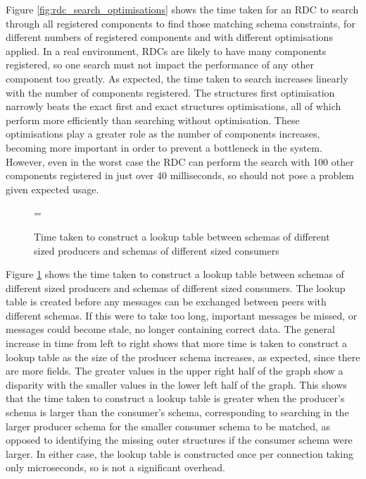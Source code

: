 \documentclass[12pt,twoside,notitlepage]{report}
\begin{document}
Figure \ref{fig:rdc_search_optimisations} shows the time taken for an RDC to search through all registered components to find those matching schema constraints, for different numbers of registered components and with different optimisations applied. 
In a real environment, RDCs are likely to have many components registered, so one search must not impact the performance of any other component too greatly.
As expected, the time taken to search increases linearly with the number of components registered. 
The structures first optimisation narrowly beats the exact first and exact structures optimisations, all of which perform more efficiently than searching without optimisation. 
These optimisations play a greater role as the number of components increases, becoming more important in order to prevent a bottleneck in the system. 
However, even in the worst case the RDC can perform the search with 100 other components registered in just over 40 milliseconds, so should not pose a problem given expected usage.

\begin{figure}[t]
\epsfxsize=\hsize
\centerline{}
\caption[Construct Lookup Times]{Time taken to construct a lookup table between schemas of different sized producers and schemas of different sized consumers}
\label{fig:construct_lookup}
\end{figure}

Figure \ref{fig:construct_lookup} shows the time taken to construct a lookup table between schemas of different sized producers and schemas of different sized consumers. 
The lookup table is created before any messages can be exchanged between peers with different schemas. 
If this were to take too long, important messages be missed, or messages could become stale, no longer containing correct data.
The general increase in time from left to right shows that more time is taken to construct a lookup table as the size of the producer schema increases, as expected, since there are more fields. 
The greater values in the upper right half of the graph show a disparity with the smaller values in the lower left half of the graph. 
This shows that the time taken to construct a lookup table is greater when the producer's schema is larger than the consumer's schema, corresponding to searching in the larger producer schema for the smaller consumer schema to be matched, as opposed to identifying the missing outer structures if the consumer schema were larger.
In either case, the lookup table is constructed once per connection taking only microseconds, so is not a significant overhead. 
\end{document}
